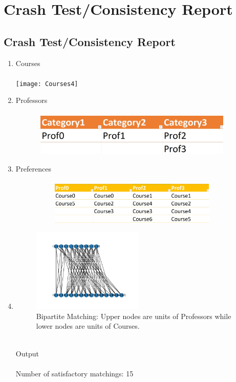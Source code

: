 \chapter{Crash Test/Consistency Report}
\section{Crash Test/Consistency Report}
\begin{enumerate}
    \item Courses \\ \\ 
    \texttt{[image: Courses4]}
    \item Professors \\ \\ 
    \includegraphics[width=12cm, height=2cm]{images/Professors4.jpeg}
    \item Preferences \\ \\
    \includegraphics[width=12cm, height=2cm]{images/Preferences4.jpeg}
    \item
    \begin{figure}[h]
    \centering
    \caption{Bipartite Matching: Upper nodes are units of Professors while lower nodes are units of Courses.}
    \includegraphics[width=0.5\textwidth]{images/Graph4.jpeg}
    \end{figure}\\
    Output \\ \\
    Number of satisfactory matchings: 15 \\ \\

\end{enumerate}
